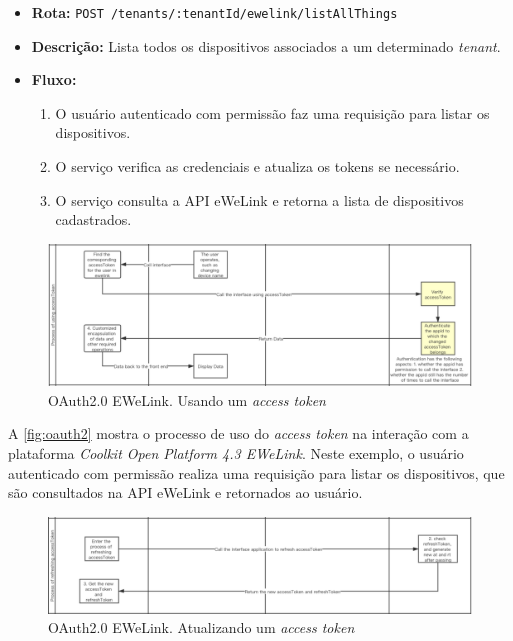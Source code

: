 \begin{itemize}
    \item \textbf{Rota:} \texttt{POST /tenants/:tenantId/ewelink/listAllThings}
    \item \textbf{Descrição:} Lista todos os dispositivos associados a um determinado \textit{tenant}.
    \item \textbf{Fluxo:}
    \begin{enumerate}
        \item O usuário autenticado com permissão faz uma requisição para listar os dispositivos.
        \item O serviço verifica as credenciais e atualiza os tokens se necessário.
        \item O serviço consulta a API eWeLink e retorna a lista de dispositivos cadastrados.
    \end{enumerate}
\end{itemize}

\begin{figure}[htp]
	\caption{\label{fig:oauth2}OAuth2.0 EWeLink. Usando um \textit{access token}}
	\begin{center}
	  \includegraphics[scale=0.45]{images/cap5/oauth_2.png}
	\end{center}
\end{figure}

A \autoref{fig:oauth2} mostra o processo de uso do \textit{access token} na interação com a plataforma \textit{Coolkit Open Platform 4.3 EWeLink}. Neste exemplo, o usuário autenticado com permissão realiza uma requisição para listar os dispositivos, que são consultados na API eWeLink e retornados ao usuário.

\begin{figure}[htp]
	\caption{\label{fig:oauth3}OAuth2.0 EWeLink. Atualizando um \textit{access token}}
	\begin{center}
	  \includegraphics[scale=0.45]{images/cap5/oauth_3.png}
	\end{center}
\end{figure}


